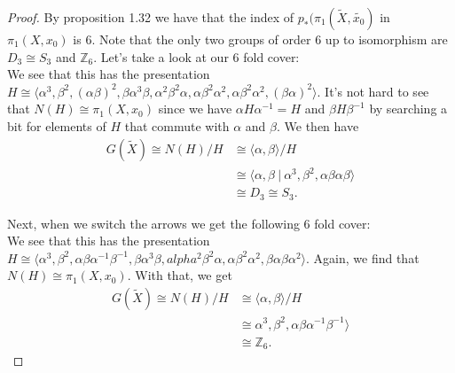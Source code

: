 \documentclass[leqno]{article}
\theoremstyle{nonumberplain}
\newtheorem{proof}{Proof}
\newcommand{\Z}{\mathbb{Z}}
\begin{document}
\begin{proof}
By proposition 1.32 we have that the index of $p_*(\pi_1(\tilde{X},\tilde{x_0})$ in $\pi_1(X,x_0)$ is 6.  Note that the only two groups of order 6 up to isomorphism are $D_3\cong S_3$ and $\Z_6$.   Let's take a look at our 6 fold cover:
\vspace*{5cm}\\
We see that this has the presentation $H\cong\langle \alpha^3,\beta^2,(\alpha \beta)^2,\beta \alpha^3 \beta,\alpha^2\beta^2\alpha,\alpha \beta^2 \alpha^2,\alpha \beta^2\alpha^2,(\beta\alpha)^2\rangle$.  It's not hard to see that $N(H)\cong\pi_1(X,x_0)$ since we have $\alpha H \alpha^{-1} =H$ and $\beta H \beta^{-1}$ by searching a bit for elements of $H$ that commute with $\alpha$ and $\beta$. We then have
\begin{align*}
G(\tilde{X})\cong N(H)/H &\cong \langle \alpha,\beta \rangle / H\\
&\cong \langle \alpha, \beta ~\vert~ \alpha^3,\beta^2,\alpha \beta \alpha \beta \rangle\\
&\cong D_3 \cong S_3.
\end{align*}

Next, when we switch the arrows we get the following 6 fold cover:
\vspace*{5cm}\\
We see that this has the presentation $H\cong \langle \alpha^3,\beta^2,\alpha \beta \alpha^{-1}\beta^{-1},\beta \alpha^3 \beta, alpha^2 \beta^2 \alpha, \alpha \beta^2 \alpha^2, \beta \alpha \beta \alpha^2 \rangle$. Again, we find that $N(H)\cong \pi_1(X,x_0)$.  With that, we get
\begin{align*}
G(\tilde{X}) \cong N(H)/H &\cong \langle \alpha,\beta \rangle / H\\
&\cong \alpha^3,\beta^2,\alpha\beta \alpha^{-1}\beta^{-1} \rangle\\
&\cong \Z_6.
\end{align*}
\end{proof}

\vspace*{1cm}
\end{document}
